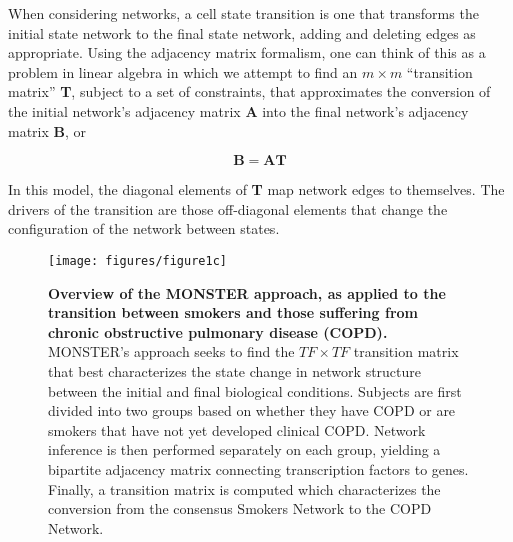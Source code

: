 \documentclass[9pt,twocolumn,twoside]{pnas-new}
\begin{document}
When considering networks, a cell state transition is one that transforms
the initial state network to the final state network, adding and deleting
edges as appropriate. Using the adjacency matrix formalism, one can
think of this as a problem in linear algebra in which we attempt to
find an $m\times m$ \textquotedblleft transition matrix\textquotedblright{}
\textbf{T}, subject to a set of constraints, that approximates the
conversion of the initial network\textquoteright s adjacency matrix
\textbf{A} into the final network\textquoteright s adjacency matrix
\textbf{B}, or 

\begin{equation}
\mathbf{B=AT}\label{eq: B=00003DAT}
\end{equation}

In this model, the diagonal elements of \textbf{T} map network edges
to themselves. The drivers of the transition are those off-diagonal
elements that change the configuration of the network between states.

\begin{figure}[h]
\texttt{[image: figures/figure1c]}
\caption{\textbf{Overview of the MONSTER approach, as applied to the transition
between smokers and those suffering from chronic obstructive pulmonary
disease (COPD).} MONSTER\textquoteright s approach seeks to find the
$TF\times TF$ transition matrix that best characterizes the state
change in network structure between the initial and final biological
conditions. Subjects are first divided into two groups based on whether
they have COPD or are smokers that have not yet developed clinical
COPD. Network inference is then performed separately on each group,
yielding a bipartite adjacency matrix connecting transcription factors
to genes. Finally, a transition matrix is computed which characterizes
the conversion from the consensus Smokers Network to the COPD Network. }
\label{fig:overview}
\end{figure}
\end{document}

